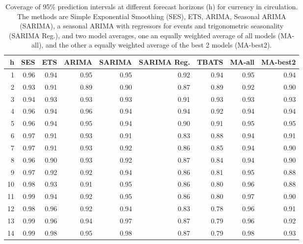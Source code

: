 \begin{table}[!h]
    \centering
\begin{tabular}{rrrrrrrrr}
  \hline
h & SES & ETS & ARIMA & SARIMA & SARIMA Reg. & TBATS & MA-all & MA-best2 \\ 
  \hline
1 & 0.96 & 0.94 & 0.95 & 0.95 & 0.92 & 0.94 & 0.95 & 0.94 \\ 
  2 & 0.93 & 0.91 & 0.89 & 0.90 & 0.87 & 0.89 & 0.92 & 0.90 \\ 
  3 & 0.94 & 0.93 & 0.93 & 0.93 & 0.91 & 0.93 & 0.93 & 0.93 \\ 
  4 & 0.96 & 0.94 & 0.96 & 0.94 & 0.94 & 0.92 & 0.94 & 0.94 \\ 
  5 & 0.96 & 0.94 & 0.95 & 0.94 & 0.90 & 0.91 & 0.95 & 0.95 \\ 
  6 & 0.97 & 0.91 & 0.93 & 0.91 & 0.83 & 0.88 & 0.94 & 0.91 \\ 
  7 & 0.97 & 0.91 & 0.93 & 0.92 & 0.86 & 0.85 & 0.94 & 0.90 \\ 
  8 & 0.96 & 0.90 & 0.93 & 0.92 & 0.87 & 0.84 & 0.94 & 0.90 \\ 
  9 & 0.97 & 0.92 & 0.92 & 0.94 & 0.86 & 0.81 & 0.95 & 0.88 \\ 
  10 & 0.98 & 0.93 & 0.91 & 0.95 & 0.86 & 0.80 & 0.96 & 0.88 \\ 
  11 & 0.99 & 0.94 & 0.92 & 0.95 & 0.86 & 0.80 & 0.97 & 0.90 \\ 
  12 & 0.98 & 0.96 & 0.92 & 0.94 & 0.83 & 0.78 & 0.96 & 0.91 \\ 
  13 & 0.99 & 0.96 & 0.94 & 0.97 & 0.87 & 0.79 & 0.96 & 0.92 \\ 
  14 & 0.99 & 0.98 & 0.95 & 0.98 & 0.87 & 0.79 & 0.98 & 0.93 \\ 
   \hline
\end{tabular}
\caption{Coverage of 95\% prediction intervals at different forecast horizons (h) for currency in circulation. The methods are Simple Exponential Smoothing (SES), ETS, ARIMA, Seasonal ARIMA (SARIMA), a seasonal ARIMA with regressors for events and trigonometric seasonality (SARIMA Reg.), and two model averages, one an equally weighted average of all models (MA-all), and the other a equally weighted average of the best 2 models (MA-best2).} 
\label{tab:covcic}
\end{table}

